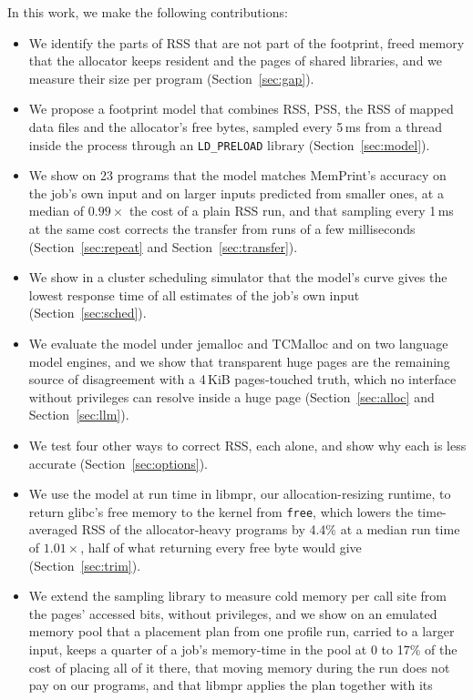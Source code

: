 \documentclass[11pt]{article}
\newcommand{\memprint}{MemPrint}
\newcommand{\secref}[1]{Section~\ref{#1}}
\begin{document}
In this work, we make the following contributions:
\begin{itemize}
\item We identify the parts of RSS that are not part of the footprint, freed memory that the allocator keeps
resident and the pages of shared libraries, and we measure their size per program (\secref{sec:gap}).
\item We propose a footprint model that combines RSS, PSS, the RSS of mapped data files and the allocator's free
bytes, sampled every 5\,ms from a thread inside the process through an \texttt{LD\_PRELOAD} library
(\secref{sec:model}).
\item We show on 23 programs that the model matches \memprint{}'s accuracy on the job's own input and on larger
inputs predicted from smaller ones, at a median of $0.99\times$ the cost of a plain RSS run, and that sampling every 1\,ms at the same cost corrects
the transfer from runs of a few milliseconds (\secref{sec:repeat} and \secref{sec:transfer}).
\item We show in a cluster scheduling simulator that the model's curve gives the lowest response time of all
estimates of the job's own input (\secref{sec:sched}).
\item We evaluate the model under jemalloc and TCMalloc and on two language model engines, and we show that
transparent huge pages are the remaining source of disagreement with a 4\,KiB pages-touched truth, which no
interface without privileges can resolve inside a huge page (\secref{sec:alloc} and \secref{sec:llm}).
\item We test four other ways to correct RSS, each alone, and show why each is less accurate
(\secref{sec:options}).
\item We use the model at run time in libmpr, our allocation-resizing runtime, to return glibc's free memory to the
kernel from \texttt{free}, which lowers the time-averaged RSS of the allocator-heavy programs by 4.4\% at a median
run time of $1.01\times$, half of what returning every free byte would give (\secref{sec:trim}).
\item We extend the sampling library to measure cold memory per call site from the pages' accessed bits, without
privileges, and we show on an emulated memory pool that a placement plan from one profile run, carried to a larger
input, keeps a quarter of a job's memory-time in the pool at 0 to 17\% of the cost of placing all of it there, that
moving memory during the run does not pay on our programs, and that libmpr applies the plan together with its

\end{itemize}
\end{document}
